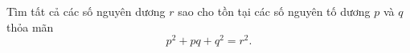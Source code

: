 \ifshowproblem
\begin{problem}\label{example:ROU-2015-MO-7-P1}
    Tìm tất cả các số nguyên dương \( r \) sao cho tồn tại các số nguyên tố dương \( p \) và \( q \) thỏa mãn
    \[
        p^2 + pq + q^2 = r^2.
    \]
\end{problem}
\fi

\footnotemark
{}
\fi